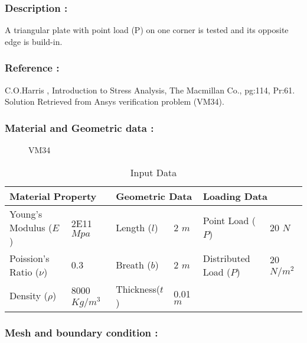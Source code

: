 \documentclass[VM.tex]{subfiles}
\begin{document}
\subsubsection*{Description : }
A triangular plate with point load (P) on one corner is tested and its opposite edge is build-in. 
\subsubsection*{Reference : }
C.O.Harris , Introduction to Stress Analysis, The Macmillan Co., pg:114, Pr:61. \\
Solution Retrieved from Ansys verification problem (VM34).

\subsubsection*{Material and Geometric data : }


\begin{figure}
\centering

\caption{VM34} \label{VM43sch}
\end{figure}
\begin{table}[ht]
\renewcommand{\arraystretch}{1.5}
\centering
\caption{Input Data}
\label{my-labelsdqf}
\begin{tabular}{|ll|ll|ll|}
\hline
\multicolumn{2}{|l|}{\cellcolor[HTML]{C0C0C0}Material Property} & \multicolumn{2}{l|}{\cellcolor[HTML]{C0C0C0}Geometric Data} & \multicolumn{2}{l|}{\cellcolor[HTML]{C0C0C0}Loading Data} \\ \hline  \hline
Young's Modulus ($E$)          & 2E11 $Mpa$         & Length ($l$)        & 2 $m$        & Point Load ($P$)        & 20 $N$         \\
Poission's Ratio ($\nu$)       & 0.3         & Breath ($b$)        & 2 $m$          & Distributed Load ($P$)        & 20 $N/m^2$       \\ 
Density ($\rho$)       & 8000 $Kg/m^3$         & Thickness($t$)        & 0.01 $m$          &    &        \\ \hline
\end{tabular}
\end{table}




\subsubsection*{Mesh and boundary condition : }
\end{document}
